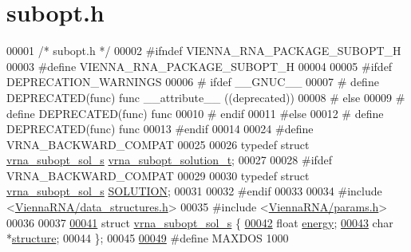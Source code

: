 \hypertarget{subopt_8h_source}{\section{subopt.\+h}
\label{subopt_8h_source}
}

\begin{DoxyCode}
00001 \textcolor{comment}{/* subopt.h */}
00002 \textcolor{preprocessor}{#ifndef VIENNA\_RNA\_PACKAGE\_SUBOPT\_H}
00003 \textcolor{preprocessor}{#define VIENNA\_RNA\_PACKAGE\_SUBOPT\_H}
00004 
00005 \textcolor{preprocessor}{#ifdef DEPRECATION\_WARNINGS}
00006 \textcolor{preprocessor}{# ifdef \_\_GNUC\_\_}
00007 \textcolor{preprocessor}{#  define DEPRECATED(func) func \_\_attribute\_\_ ((deprecated))}
00008 \textcolor{preprocessor}{# else}
00009 \textcolor{preprocessor}{#  define DEPRECATED(func) func}
00010 \textcolor{preprocessor}{# endif}
00011 \textcolor{preprocessor}{#else}
00012 \textcolor{preprocessor}{# define DEPRECATED(func) func}
00013 \textcolor{preprocessor}{#endif}
00014 
00024 \textcolor{preprocessor}{#define VRNA\_BACKWARD\_COMPAT}
00025 
00026 \textcolor{keyword}{typedef} \textcolor{keyword}{struct }\hyperlink{structvrna__subopt__sol__s}{vrna\_subopt\_sol\_s}   \hyperlink{structvrna__subopt__sol__s}{vrna\_subopt\_solution\_t};
00027 
00028 \textcolor{preprocessor}{#ifdef VRNA\_BACKWARD\_COMPAT}
00029 
00030 \textcolor{keyword}{typedef} \textcolor{keyword}{struct }\hyperlink{structvrna__subopt__sol__s}{vrna\_subopt\_sol\_s}   \hyperlink{structvrna__subopt__sol__s}{SOLUTION};
00031 
00032 \textcolor{preprocessor}{#endif}
00033 
00034 \textcolor{preprocessor}{#include <\hyperlink{data__structures_8h}{ViennaRNA/data\_structures.h}>}
00035 \textcolor{preprocessor}{#include <\hyperlink{params_8h}{ViennaRNA/params.h}>}
00036 
00037 
\hypertarget{subopt_8h_source_l00041}{}\hyperlink{structvrna__subopt__sol__s}{00041} \textcolor{keyword}{struct }\hyperlink{structvrna__subopt__sol__s}{vrna\_subopt\_sol\_s} \{
\hypertarget{subopt_8h_source_l00042}{}\hyperlink{structvrna__subopt__sol__s_a99bc26ca68392aa4656386cf73b73fef}{00042}   \textcolor{keywordtype}{float} \hyperlink{structvrna__subopt__sol__s_a99bc26ca68392aa4656386cf73b73fef}{energy};       
\hypertarget{subopt_8h_source_l00043}{}\hyperlink{structvrna__subopt__sol__s_a3c632c7f08eb6a8827c6151625e5ef8e}{00043}   \textcolor{keywordtype}{char} *\hyperlink{structvrna__subopt__sol__s_a3c632c7f08eb6a8827c6151625e5ef8e}{structure};    
00044 \};
00045 
\hypertarget{subopt_8h_source_l00049}{}\hyperlink{subopt_8h_a5ec740b80afb4906ba4311dbd8ddbd89}{00049} \textcolor{preprocessor}{#define MAXDOS                1000}

\end{DoxyCode}
